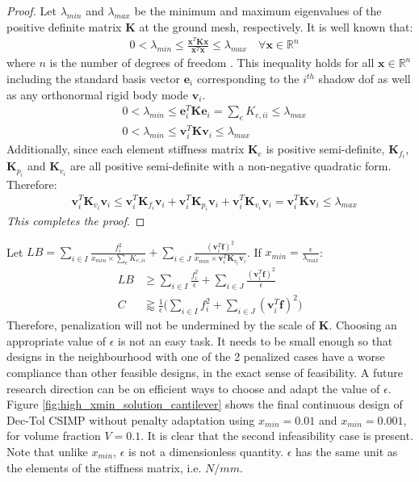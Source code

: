   \begin{proof}
    Let $\lambda_{min}$ and $\lambda_{max}$ be the minimum and maximum eigenvalues of the positive definite matrix $\bm{K}$ at the ground mesh, respectively. It is well known that:
    \begin{align}
      &  0 < \lambda_{min} \leq \frac{\bm{x}^T \bm{K} \bm{x}}{\bm{x}^T \bm{x}} \leq \lambda_{max} \quad \forall \bm{x} \in \mathbb{R}^n
    \end{align}
    where $n$ is the number of degrees of freedom \cite{Golub1996}. This inequality holds for all $\bm{x} \in \mathbb{R}^n$ including the standard basis vector $\bm{e}_i$ corresponding to the $i^{th}$ shadow dof as well as any orthonormal rigid body mode $\bm{v}_i$.
    \begin{align}
      &  0 < \lambda_{min} \leq \bm{e}_i^T \bm{K} \bm{e}_i = \sum_e K_{e,ii} \leq \lambda_{max} \\
      &  0 < \lambda_{min} \leq \bm{v}_i^T \bm{K} \bm{v}_i \leq \lambda_{max}
    \end{align}
    Additionally, since each element stiffness matrix $\bm{K}_e$ is positive semi-definite, $\bm{K}_{f_i}$, $\bm{K}_{p_i}$ and $\bm{K}_{v_i}$ are all positive semi-definite with a non-negative quadratic form. Therefore:
    \begin{align}
      & \bm{v}_i^T \bm{K}_{v_i} \bm{v}_i \leq \bm{v}_i^T \bm{K}_{f_i} \bm{v}_i + \bm{v}_i^T \bm{K}_{p_i} \bm{v}_i + \bm{v}_i^T \bm{K}_{v_i} \bm{v}_i = \bm{v}_i^T \bm{K} \bm{v}_i \leq \lambda_{max}
    \end{align}
    \textit{This completes the proof}.
  \end{proof}

  Let $LB = \sum_{i \in I} \frac{f^2_i}{x_{min} \times \sum_e K_{e,ii}} + \sum_{i \in J} \frac{(\bm{v}_i^T \bm{f})^2}{x_{min} \times \bm{v}_i^T \bm{K}_{v_i} \bm{v}_i}$. If $x_{min} = \frac{\epsilon}{\lambda_{max}}$:
  \begin{align}
    LB & \geq \sum_{i \in I} \frac{f^2_i}{\epsilon} + \sum_{i \in J} \frac{(\bm{v}_i^T \bm{f})^2}{\epsilon} \\
    C & \gtrapprox \frac{1}{\epsilon} \Bigg( \sum_{i \in I} f^2_i + \sum_{i \in J} (\bm{v}_i^T \bm{f})^2 \Bigg)
  \end{align} 
  Therefore, penalization will not be undermined by the scale of $\bm{K}$. Choosing an appropriate value of $\epsilon$ is not an easy task. It needs to be small enough so that designs in the neighbourhood with one of the 2 penalized cases have a worse compliance than other feasible designs, in the exact sense of feasibility. A future research direction can be on efficient ways to choose and adapt the value of $\epsilon$. Figure \ref{fig:high_xmin_solution_cantilever} shows the final continuous design of Dec-Tol CSIMP without penalty adaptation using $x_{min} = 0.01$ and $x_{min} = 0.001$, for volume fraction $V = 0.1$. It is clear that the second infeasibility case is present. Note that unlike $x_{min}$, $\epsilon$ is not a dimensionless quantity. $\epsilon$ has the same unit as the elements of the stiffness matrix, i.e. $N/mm$.

